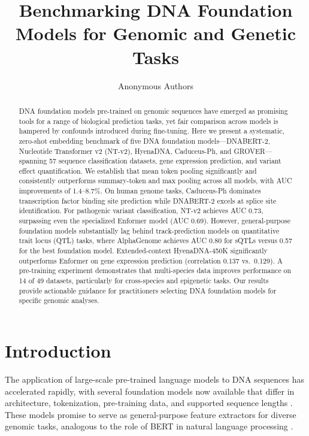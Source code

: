 \documentclass[11pt]{article}
\title{Benchmarking DNA Foundation Models for Genomic and Genetic Tasks}
\author{Anonymous Authors}
\date{}
\begin{document}
\maketitle

\begin{abstract}
DNA foundation models pre-trained on genomic sequences have emerged as promising tools for a range of biological prediction tasks, yet fair comparison across models is hampered by confounds introduced during fine-tuning. Here we present a systematic, zero-shot embedding benchmark of five DNA foundation models---DNABERT-2, Nucleotide Transformer v2 (NT-v2), HyenaDNA, Caduceus-Ph, and GROVER---spanning 57 sequence classification datasets, gene expression prediction, and variant effect quantification. We establish that mean token pooling significantly and consistently outperforms summary-token and max pooling across all models, with AUC improvements of 1.4--8.7\%. On human genome tasks, Caduceus-Ph dominates transcription factor binding site prediction while DNABERT-2 excels at splice site identification. For pathogenic variant classification, NT-v2 achieves AUC 0.73, surpassing even the specialized Enformer model (AUC 0.69). However, general-purpose foundation models substantially lag behind track-prediction models on quantitative trait locus (QTL) tasks, where AlphaGenome achieves AUC 0.80 for sQTLs versus 0.57 for the best foundation model. Extended-context HyenaDNA-450K significantly outperforms Enformer on gene expression prediction (correlation 0.137 vs.\ 0.129). A pre-training experiment demonstrates that multi-species data improves performance on 14 of 49 datasets, particularly for cross-species and epigenetic tasks. Our results provide actionable guidance for practitioners selecting DNA foundation models for specific genomic analyses.
\end{abstract}

\section{Introduction}

The application of large-scale pre-trained language models to DNA sequences has accelerated rapidly, with several foundation models now available that differ in architecture, tokenization, pre-training data, and supported sequence lengths \citep{zhou2023dnabert2, dallatorre2023nucleotide, nguyen2024hyenadna, schiff2024caduceus, sanabria2024grover}. These models promise to serve as general-purpose feature extractors for diverse genomic tasks, analogous to the role of BERT in natural language processing \citep{devlin2019bert}.
\end{document}
